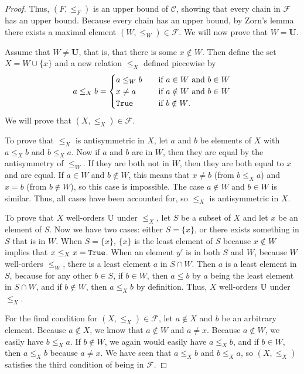 \documentclass[../math.tex]{subfiles}
\begin{document}
\begin{proof}
    Thus, $(F, \leq_F)$ is an upper bound of $\mathcal C$, showing that every
    chain in $\mathcal F$ has an upper bound.  Because every chain has an upper
    bound, by Zorn's lemma there exists a maximal element $(W, \leq_W) \in
    \mathcal F$.  We will now prove that $W = \bm U$.

    Assume that $W \neq \bm U$, that is, that there is some $x \notin W$.  Then
    define the set $X = W \cup \{x\}$ and a new relation $\leq_X$ defined
    piecewise by
    \[
        a \leq_X b =
        \begin{cases}
            a \leq_W b  & \quad \text{if $a \in W$ and $b \in W$} \\
            x \neq a    & \quad \text{if $a \notin W$ and $b \in W$} \\
            \verb|True| & \quad \text{if $b \notin W$.}
        \end{cases}
    \]
    We will prove that $(X, \leq_X) \in \mathcal F$.

    To prove that $\leq_X$ is antisymmetric in $X$, let $a$ and $b$ be elements
    of $X$ with $a \leq_X b$ and $b \leq_X a$.  Now if $a$ and $b$ are in $W$,
    then they are equal by the antisymmetry of $\leq_W$.  If they are both not
    in $W$, then they are both equal to $x$ and are equal.  If $a \in W$ and $b
    \notin W$, this means that $x \neq b$ (from $b \leq_X a$) and $x = b$ (from
    $b \notin W$), so this case is impossible.  The case $a \notin W$ and $b \in
    W$ is similar.  Thus, all cases have been accounted for, so $\leq_X$ is
    antisymmetric in $X$.

    To prove that $X$ well-orders $\mathbb{U}$ under $\leq_X$, let $S$ be a subset of
    $X$ and let $x$ be an element of $S$.  Now we have two cases: either $S =
    \{x\}$, or there exists something in $S$ that is in $W$.  When $S = \{x\}$,
    $\{x\}$ is the least element of $S$ because $x \notin W$ implies that $x
    \leq_X x = \verb|True|$.  When an element $y'$ is in both $S$ and $W$,
    because $W$ well-orders $\leq_W$, there is a least element $a$ in $S \cap
    W$.  Then $a$ is a least element in $S$, because for any other $b \in S$, if
    $b \in W$, then $a \leq b$ by $a$ being the least element in $S \cap W$, and
    if $b \notin W$, then $a \leq_X b$ by definition.  Thus, $X$ well-orders
    $\mathbb{U}$ under $\leq_X$.

    For the final condition for $(X, \leq_X) \in \mathcal F$, let $a \notin X$
    and $b$ be an arbitrary element.  Because $a \notin X$, we know that $a
    \notin W$ and $a \neq x$.  Because $a \notin W$, we easily have $b \leq_X
    a$.  If $b \notin W$, we again would easily have $a \leq_X b$, and if $b \in
    W$, then $a \leq_X b$ because $a \neq x$.  We have seen that $a \leq_X b$
    and $b \leq_X a$, so $(X, \leq_X)$ satisfies the third condition of being in
    $\mathcal F$.


\end{proof}
\end{document}
